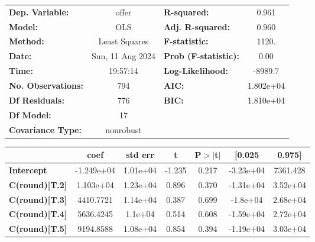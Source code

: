 \begin{center}
\begin{tabular}{lclc}
\toprule
\textbf{Dep. Variable:}               &      offer       & \textbf{  R-squared:         } &     0.961   \\
\textbf{Model:}                       &       OLS        & \textbf{  Adj. R-squared:    } &     0.960   \\
\textbf{Method:}                      &  Least Squares   & \textbf{  F-statistic:       } &     1120.   \\
\textbf{Date:}                        & Sun, 11 Aug 2024 & \textbf{  Prob (F-statistic):} &     0.00    \\
\textbf{Time:}                        &     19:57:14     & \textbf{  Log-Likelihood:    } &   -8989.7   \\
\textbf{No. Observations:}            &         794      & \textbf{  AIC:               } & 1.802e+04   \\
\textbf{Df Residuals:}                &         776      & \textbf{  BIC:               } & 1.810e+04   \\
\textbf{Df Model:}                    &          17      & \textbf{                     } &             \\
\textbf{Covariance Type:}             &    nonrobust     & \textbf{                     } &             \\
\bottomrule
\end{tabular}
\begin{tabular}{lcccccc}
                                      & \textbf{coef} & \textbf{std err} & \textbf{t} & \textbf{P$> |$t$|$} & \textbf{[0.025} & \textbf{0.975]}  \\
\midrule
\textbf{Intercept}                    &   -1.249e+04  &     1.01e+04     &    -1.235  &         0.217        &    -3.23e+04    &     7361.428     \\
\textbf{C(round)[T.2]}                &    1.103e+04  &     1.23e+04     &     0.896  &         0.370        &    -1.31e+04    &     3.52e+04     \\
\textbf{C(round)[T.3]}                &    4410.7721  &     1.14e+04     &     0.387  &         0.699        &     -1.8e+04    &     2.68e+04     \\
\textbf{C(round)[T.4]}                &    5636.4245  &      1.1e+04     &     0.514  &         0.608        &    -1.59e+04    &     2.72e+04     \\
\textbf{C(round)[T.5]}                &    9194.8588  &     1.08e+04     &     0.854  &         0.394        &    -1.19e+04    &     3.03e+04     \\

\end{tabular}
\end{center}

